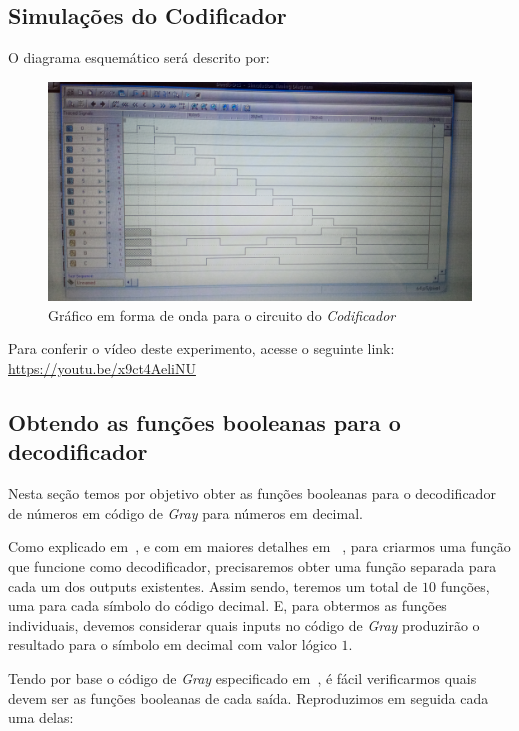 \documentclass[12pt]{article}
\begin{document}
\subsection{Simulações do Codificador}\label{sec:2.2}

O diagrama esquemático será descrito por:

\begin{figure}[H]
    \centering
    \includegraphics[width=12cm]{Exp05/2.2.png}
    \caption{Gráfico em forma de onda para o circuito do \emph{Codificador}}
    \label{fig:2.2.png}
\end{figure}

Para conferir o vídeo deste experimento, acesse o seguinte link:
\href{https://youtu.be/x9ct4AeliNU}{https://youtu.be/x9ct4AeliNU}

\subsection{Obtendo as funções booleanas para o decodificador}\label{sec:2.3}

Nesta seção temos por objetivo obter as funções booleanas para o decodificador
de números em código de \emph{Gray} para números em decimal.

Como explicado em~\cite{codificadores_mandelli}, e com em maiores detalhes em
~\cite{codificadores_e_decodificadores}, para criarmos uma função que funcione
como decodificador, precisaremos obter uma função separada para cada um dos
outputs existentes. Assim sendo, teremos um total de $10$ funções, uma para cada
símbolo do código decimal. E, para obtermos as funções individuais, devemos
considerar quais inputs no código de \emph{Gray} produzirão o resultado para o
símbolo em decimal com valor lógico $1$.

Tendo por base o código de \emph{Gray} especificado
em~\cite{gray_code_table}, é fácil
verificarmos quais devem ser as funções booleanas de cada saída. Reproduzimos em
seguida cada uma delas:
\end{document}
